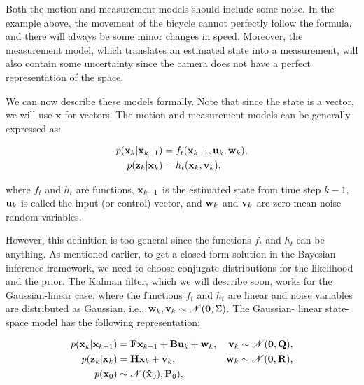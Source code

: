 Both the motion and measurement models should include some noise. In the 
example above, the movement of the bicycle cannot perfectly follow the formula, 
and there will always be some minor changes in speed. Moreover, the measurement 
model, which translates an estimated state into a measurement, will also 
contain some uncertainty since the camera does not have a perfect 
representation of the space.

We can now describe these models formally. Note that since the state is a 
vector, we will use $\mathbf{x}$ for vectors. The motion and measurement models 
can be generally expressed as:

\begin{align*}
    p(\vecat{x}{k} | \vecat{x}{k-1}) 
        &= f_t(\vecat{x}{k-1}, \vecat{u}{k}, \vecat{w}{k}), \\
    p(\vecat{z}{k} | \vecat{x}{k}) 
        &= h_t(\vecat{x}{k}, \vecat{v}{k}),
\end{align*}

where $f_t$ and $h_t$ are functions, $\vecat{x}{k-1}$ is the estimated state 
from time step $k-1$, $\vecat{u}{k}$ is called the input (or control) vector, 
and $\vecat{w}{k}$ and $\vecat{v}{k}$ are zero-mean noise random variables.

However, this definition is too general since the functions $f_t$ and $h_t$ can 
be anything. As mentioned earlier, to get a closed-form solution in the 
Bayesian inference framework, we need to choose conjugate distributions for the 
likelihood and the prior. The Kalman filter, which we will describe soon, works 
for the Gaussian-linear case, where the functions $f_t$ and $h_t$ are linear 
and noise variables are distributed as Gaussian, i.e., 
$\vecat{w}{k}, \vecat{v}{k} \sim \mathscr{N}(\mathbf{0}, \Sigma)$. The Gaussian-
linear state-space model has the following representation:

\begin{align}
    p(\vecat{x}{k} | \vecat{x}{k-1}) 
        &= \mathbf{F} \vecat{x}{k-1}
            + \mathbf{B} \vecat{u}{k}
            + \vecat{w}{k},
        & \vecat{v}{k} \sim \mathscr{N}(\mathbf{0}, \mathbf{Q}), \\
    p(\vecat{z}{k} | \vecat{x}{k})
        &= \mathbf{H} \vecat{x}{k} + \vecat{v}{k},
        & \vecat{w}{k} \sim \mathscr{N}(\mathbf{0}, \mathbf{R}), \\
    p(\vecat{x}{0}) &\sim \mathscr{N}(\vecat{\hat{x}}{0}), \vecat{P}{0}),&
\end{align}

